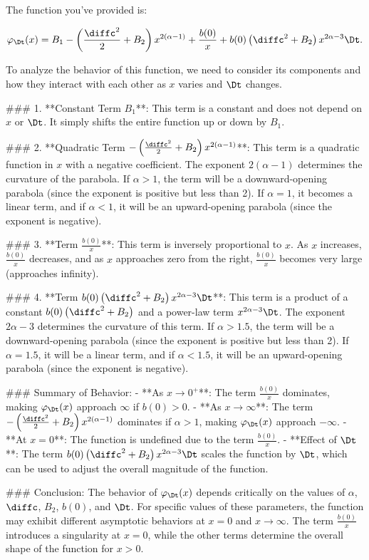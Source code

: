The function you've provided is:

\[
\varphi_\Dt(x) = B_1 - \left(\frac{\diffc^2}{2} + B_2\right)x^{2(\alpha-1)} + \frac{b(0)}{x} + b(0)\left(\diffc^2 + B_2\right)x^{2\alpha-3}\Dt.
\]

To analyze the behavior of this function, we need to consider its components and how they interact with each other as \(x\) varies and \(\Dt\) changes.

### 1. **Constant Term \(B_1\)**:
This term is a constant and does not depend on \(x\) or \(\Dt\). It simply shifts the entire function up or down by \(B_1\).

### 2. **Quadratic Term \(-\left(\frac{\diffc^2}{2} + B_2\right)x^{2(\alpha-1)}\)**:
This term is a quadratic function in \(x\) with a negative coefficient. The exponent \(2(\alpha-1)\) determines the curvature of the parabola. If \(\alpha > 1\), the term will be a downward-opening parabola (since the exponent is positive but less than 2). If \(\alpha = 1\), it becomes a linear term, and if \(\alpha < 1\), it will be an upward-opening parabola (since the exponent is negative).

### 3. **Term \(\frac{b(0)}{x}\)**:
This term is inversely proportional to \(x\). As \(x\) increases, \(\frac{b(0)}{x}\) decreases, and as \(x\) approaches zero from the right, \(\frac{b(0)}{x}\) becomes very large (approaches infinity).

### 4. **Term \(b(0)\left(\diffc^2 + B_2\right)x^{2\alpha-3}\Dt\)**:
This term is a product of a constant \(b(0)\left(\diffc^2 + B_2\right)\) and a power-law term \(x^{2\alpha-3}\Dt\). The exponent \(2\alpha - 3\) determines the curvature of this term. If \(\alpha > 1.5\), the term will be a downward-opening parabola (since the exponent is positive but less than 2). If \(\alpha = 1.5\), it will be a linear term, and if \(\alpha < 1.5\), it will be an upward-opening parabola (since the exponent is negative).

### Summary of Behavior:
- **As \(x \to 0^+\)**: The term \(\frac{b(0)}{x}\) dominates, making \(\varphi_\Dt(x)\) approach \(\infty\) if \(b(0) > 0\).
- **As \(x \to \infty\)**: The term \(-\left(\frac{\diffc^2}{2} + B_2\right)x^{2(\alpha-1)}\) dominates if \(\alpha > 1\), making \(\varphi_\Dt(x)\) approach \(-\infty\).
- **At \(x = 0\)**: The function is undefined due to the term \(\frac{b(0)}{x}\).
- **Effect of \(\Dt\)**: The term \(b(0)\left(\diffc^2 + B_2\right)x^{2\alpha-3}\Dt\) scales the function by \(\Dt\), which can be used to adjust the overall magnitude of the function.

### Conclusion:
The behavior of \(\varphi_\Dt(x)\) depends critically on the values of \(\alpha\), \(\diffc\), \(B_2\), \(b(0)\), and \(\Dt\). For specific values of these parameters, the function may exhibit different asymptotic behaviors at \(x = 0\) and \(x \to \infty\). The term \(\frac{b(0)}{x}\) introduces a singularity at \(x = 0\), while the other terms determine the overall shape of the function for \(x > 0\).